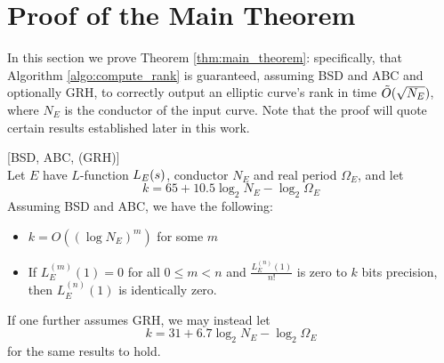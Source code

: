 
\section{Proof of the Main Theorem}\label{sec:main_thrm_proof}

In this section we prove Theorem \ref{thm:main_theorem}: specifically, that Algorithm \ref{algo:compute_rank} is guaranteed, assuming BSD and ABC and optionally GRH, to correctly output an elliptic curve's rank in time $\tilde{O}(\sqrt{N_E})$, where $N_E$ is the conductor of the input curve. Note that the proof will quote certain results established later in this work. \\

\begin{proposition}\label{prop:k_bits_for_leading_coeff}[BSD, ABC, (GRH)] \\
Let $E$ have $L$-function $L_E(s)$, conductor $N_E$ and real period $\Omega_E$, and let
\begin{equation}\label{eqn:num_bits_without_GRH}
k = 65 + 10.5 \log_2 N_E - \log_2 \Omega_E
\end{equation}
Assuming BSD and ABC, we have the following:
\begin{itemize}
\item $k = O((\log N_E)^m)$ for some $m$
\item If $L_E^{(m)}(1)=0$ for all $0 \le m < n$ and $\frac{L_E^{(n)}(1)}{n!}$ is zero to $k$ bits precision, then $L_E^{(n)}(1)$ is identically zero.
\end{itemize}
\end{proposition}
If one further assumes GRH, we may instead let
\begin{equation}\label{eqn:num_bits_with_GRH}
k = 31 + 6.7 \log_2 N_E - \log_2 \Omega_E
\end{equation}
for the same results to hold.
